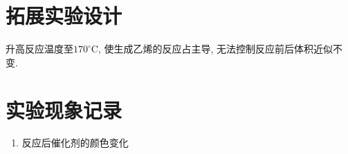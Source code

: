 \documentclass[a4paper]{article}
\begin{document}

\section{拓展实验设计}
升高反应温度至$170^\circ$C, 使生成乙烯的反应占主导, 无法控制反应前后体积近似不变.
\section{实验现象记录}
\begin{enumerate}
	\item 反应后催化剂的颜色变化
\end{enumerate}

\newpage
\end{document}
